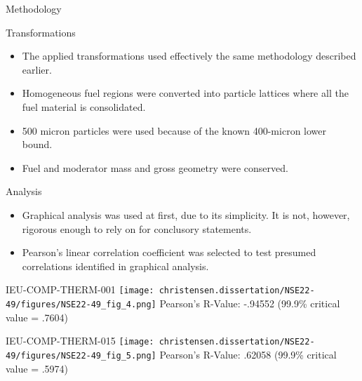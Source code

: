\documentclass[10pt,aspectratio=169]{beamer}              %
\begin{document}
\begin{frame}{Methodology}
    \begin{block}{Transformations}
        \begin{itemize}
            \item The applied transformations used effectively the same methodology described earlier.
            \item Homogeneous fuel regions were converted into particle lattices where all the fuel material is consolidated.
            \item 500 micron particles were used because of the known 400-micron lower bound.
            \item Fuel and moderator mass and gross geometry were conserved.
        \end{itemize} 
    \end{block}
    \begin{block}{Analysis}
        \begin{itemize}
            \item Graphical analysis was used at first, due to its simplicity. It is not, however, rigorous enough to rely on for conclusory statements.
            \item Pearson's linear correlation coefficient was selected to test presumed correlations identified in graphical analysis.
        \end{itemize}
    \end{block}
\end{frame}

\begin{frame}{IEU-COMP-THERM-001}
    \centering
    \texttt{[image: christensen.dissertation/NSE22-49/figures/NSE22-49\_fig\_4.png]}
    Pearson's R-Value: -.94552 (99.9\% critical value = .7604)
\end{frame}

\begin{frame}{IEU-COMP-THERM-015}
    \centering
    \texttt{[image: christensen.dissertation/NSE22-49/figures/NSE22-49\_fig\_5.png]}
    Pearson's R-Value: .62058 (99.9\% critical value = .5974)
\end{frame}
\end{document}

